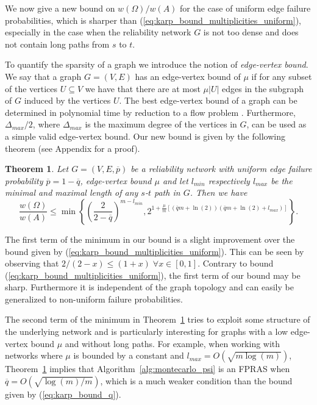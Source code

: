 \documentclass{article}
\newtheorem{theorem}{Theorem}
\begin{document}
We now give a new bound on
$w(\Omega)/w(A)$ for the case of uniform edge failure probabilities,
which is sharper than (\ref{eq:karp_bound_multiplicities_uniform}),
especially in the case when the reliability network $G$ is
not too dense and does not contain long paths from $s$
to $t$.

To quantify the sparsity
of a graph we introduce the notion of \textit{\mbox{edge-vertex} bound}.
We say that a graph $G=(V,E)$
has an \mbox{edge-vertex} bound of $\mu$ if for any subset of the
vertices $U\subseteq V$ we have that there are at most $\mu
|U|$ edges in the subgraph of $G$ induced by the vertices
$U$. The best \mbox{edge-vertex} bound of a graph can be determined
in polynomial time by reduction to a flow problem \cite{gallo_1989_fast}. Furthermore,
$\Delta_{max}/2$, where $\Delta_{max}$ is the maximum degree of the
vertices in $G$, can be used as a simple valid \mbox{edge-vertex} bound.
Our new bound is given by the following theorem (see Appendix for a proof).

\begin{theorem}\label{thm:improved_bound}
Let $G=(V,E,\overline{p})$ be a reliability network with
uniform edge failure probability $\overline{p}=1-\overline{q}$,
\mbox{edge-vertex} bound $\mu$ and let $l_{min}$ respectively $l_{max}$ be the minimal and maximal length
of any $s$-$t$ path in $G$. Then we
have
\begin{equation*}
\frac{w(\Omega)}{w(A)}\leq \min\left\{\left(\frac{2}{2-\overline{q}}\right)^{m-l_{min}},2^{1+\frac{\mu}{m}\left[(\overline{q}m+\ln(2))(\overline{q}m+\ln(2)+l_{max})\right]}\right\}.
\end{equation*}
\end{theorem}

The first term of the minimum in our bound is a
slight improvement over the bound given by
(\ref{eq:karp_bound_multiplicities_uniform}). This can be
seen by observing that $2/(2-x)\leq (1+x) \;\forall x\in
[0,1]$. Contrary to bound
(\ref{eq:karp_bound_multiplicities_uniform}), the first term
of our bound may
be sharp. Furthermore it is independent of the graph topology and can easily
be generalized to \mbox{non-uniform} failure probabilities.

The second term of the minimum in
Theorem~\ref{thm:improved_bound} tries to exploit some
structure of the underlying network and is particularly interesting
for graphs with a low \mbox{edge-vertex} bound $\mu$ and without
long paths. For example, when working with networks where $\mu$ is bounded
by a constant and $l_{max}=O(\sqrt{m\log(m)})$,
Theorem~\ref{thm:improved_bound} implies that
Algorithm~\ref{alg:montecarlo_psi} is an FPRAS when
$\overline{q}=O(\sqrt{\log(m)/m})$,
which is a much weaker condition than the bound given by (\ref{eq:karp_bound_q}).
\end{document}
